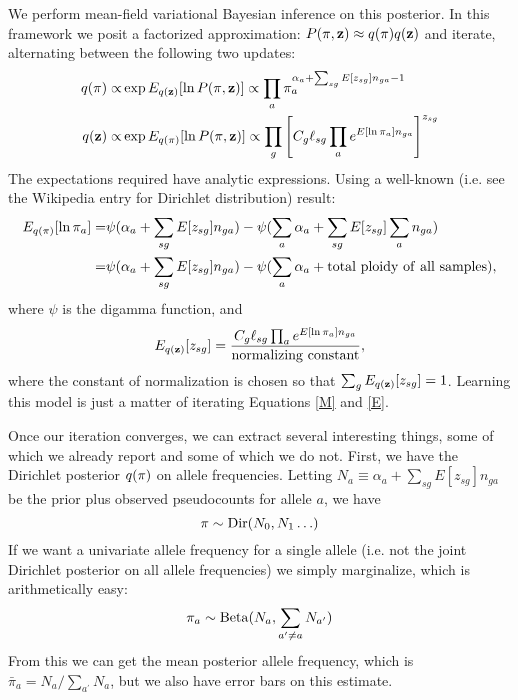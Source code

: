 \documentclass[nofootinbib,amssymb,amsmath]{revtex4}
\newcommand{\vz}{{\bf z}}
\newcommand{\vpi}{{\bf \pi}}
\begin{document}
We perform mean-field variational Bayesian inference on this posterior.  In this framework we posit a factorized approximation: $P(\vpi, \vz) \approx q(\vpi) q(\vz)$ and iterate, alternating between the following two updates:
\begin{align}
q(\vpi) \propto& \exp E_{q(\vz)}[\ln P(\vpi, \vz)] \propto \prod_a \pi_a^{\alpha_a + \sum_{sg} E[z_{sg}] n_{ga} - 1} \label{M}\\
q(\vz) \propto& \exp E_{q(\vpi)}[\ln P(\vpi, \vz)] \propto \prod_g \left[ C_g \ell_{sg} \prod_a e^{ E[\ln \pi_a] n_{ga}} \right]^{z_{sg}} \label{E}
\end{align}
The expectations required have analytic expressions.  Using a well-known (i.e. see the Wikipedia entry for Dirichlet distribution) result:
\begin{align}
E_{q(\vpi)} [ \ln \pi_a ] =& \psi( \alpha_a + \sum_{sg} E[z_{sg}] n_{ga}) - \psi (\sum_a \alpha_a + \sum_{sg} E[z_{sg}]  \sum_a n_{ga}) \\
=& \psi( \alpha_a + \sum_{sg} E[z_{sg}] n_{ga}) - \psi (\sum_a \alpha_a + {\rm total~ploidy~of~all~samples}),
\label{pi_update}
\end{align}
where $\psi$ is the digamma function, and
\begin{align}
E_{q(\vz)}[z_{sg}] = \frac{C_g \ell_{sg} \prod_a e^{ E[\ln \pi_a] n_{ga}}}{\rm normalizing~constant},
\label{z_update}
\end{align}
where the constant of normalization is chosen so that $\sum_g E_{q(\vz)}[z_{sg}] = 1$.  Learning this model is just a matter of iterating Equations \ref{M} and \ref{E}.

Once our iteration converges, we can extract several interesting things, some of which we already report and some of which we do not.  First, we have the Dirichlet posterior $q(\vpi)$ on allele frequencies.  Letting $N_a \equiv \alpha_a + \sum_{sg} E[z_{sg}] n_{ga}$ be the prior plus observed pseudocounts for allele $a$, we have
\begin{equation}
\vpi \sim {\rm Dir}(N_0, N_1 \ldots)
\end{equation}
If we want a univariate allele frequency for a single allele (i.e. not the joint Dirichlet posterior on all allele frequencies) we simply marginalize, which is arithmetically easy:
\begin{equation}
\pi_a \sim {\rm Beta}(N_a, \sum_{a^\prime \ne a} N_{a^\prime})
\end{equation}
From this we can get the mean posterior allele frequency, which is $\bar{\pi}_a = N_a / \sum_{a^\prime} N_a$, but we also have error bars on this estimate.
\end{document}
